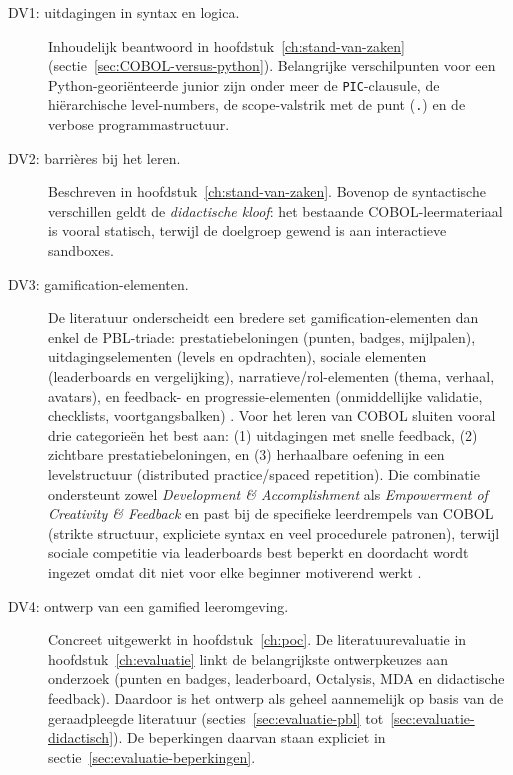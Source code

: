 \begin{description}
    \item[DV1: uitdagingen in syntax en logica.] Inhoudelijk beantwoord in hoofdstuk~\ref{ch:stand-van-zaken} (sectie~\ref{sec:COBOL-versus-python}). Belangrijke verschilpunten voor een Python-georiënteerde junior zijn onder meer de \texttt{PIC}-clausule, de hiërarchische level-numbers, de scope-valstrik met de punt (\texttt{.}) en de verbose programmastructuur.

    \item[DV2: barrières bij het leren.] Beschreven in hoofdstuk~\ref{ch:stand-van-zaken}. Bovenop de syntactische verschillen geldt de \emph{didactische kloof}: het bestaande COBOL-leermateriaal is vooral statisch, terwijl de doelgroep gewend is aan interactieve sandboxes.

    \item[DV3: gamification-elementen.] De literatuur onderscheidt een bredere set gamification-\allowbreak elementen dan enkel de PBL-triade: prestatiebeloningen (punten, badges, mijlpalen), uitdagingselementen (levels en opdrachten), sociale elementen (leaderboards en vergelijking), narratieve/rol-\allowbreak elementen (thema, verhaal, avatars), en feedback- en progressie-\allowbreak elementen (onmiddellijke validatie, checklists, voortgangsbalken) \autocite{KevinWerbach2020, Chou2015}. Voor het leren van COBOL sluiten vooral drie categorie\"en het best aan: (1) uitdagingen met snelle feedback, (2) zichtbare prestatiebeloningen, en (3) herhaalbare oefening in een levelstructuur (distributed practice/spaced repetition). Die combinatie ondersteunt zowel \textit{Development \& Accomplishment} als \textit{Empowerment of Creativity \& Feedback} en past bij de specifieke leerdrempels van COBOL (strikte structuur, expliciete syntax en veel procedurele patronen), terwijl sociale competitie via leaderboards best beperkt en doordacht wordt ingezet omdat dit niet voor elke beginner motiverend werkt \autocite{Zhan2022, KevinWerbach2020, Cepeda2006}.

    \item[DV4: ontwerp van een gamified leeromgeving.] Concreet uitgewerkt in hoofdstuk~\ref{ch:poc}. De literatuurevaluatie in hoofdstuk~\ref{ch:evaluatie} linkt de belangrijkste ontwerpkeuzes aan onderzoek (punten en badges, leaderboard, Octalysis, MDA en didactische feedback). Daardoor is het ontwerp als geheel aannemelijk op basis van de geraadpleegde literatuur (secties~\ref{sec:evaluatie-pbl} tot~\ref{sec:evaluatie-didactisch}). De beperkingen daarvan staan expliciet in sectie~\ref{sec:evaluatie-beperkingen}.


\end{description}
